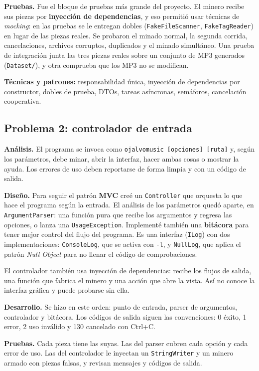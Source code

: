 \documentclass{article}
\begin{document}
\textbf{Pruebas.} Fue el bloque de pruebas más grande del proyecto. El
minero recibe sus piezas por \textbf{inyección de dependencias}, y eso
permitió usar técnicas de \emph{mocking}: en las pruebas se le entregan
dobles (\texttt{FakeFileScanner}, \texttt{FakeTagReader}) en lugar de las
piezas reales. Se probaron el minado normal, la segunda corrida,
cancelaciones, archivos corruptos, duplicados y el minado simultáneo. Una
prueba de integración junta las tres piezas reales sobre un conjunto de MP3
generados (\texttt{Dataset/}), y otra comprueba que los MP3 no se modifican.

\textbf{Técnicas y patrones:} responsabilidad única, inyección de
dependencias por constructor, dobles de prueba, DTOs, tareas asíncronas,
semáforos, cancelación cooperativa.

\subsection{Problema 2: controlador de entrada}

\textbf{Análisis.} El programa se invoca como
\texttt{ojalvomusic [opciones] [ruta]} y, según los parámetros, debe minar,
abrir la interfaz, hacer ambas cosas o mostrar la ayuda. Los errores de uso
deben reportarse de forma limpia y con un código de salida.

\textbf{Diseño.} Para seguir el patrón \textbf{MVC} creé un
\texttt{Controller} que orquesta lo que hace el programa según la entrada. El
análisis de los parámetros quedó aparte, en \texttt{ArgumentParser}: una
función pura que recibe los argumentos y regresa las opciones, o lanza una
\texttt{UsageException}. Implementé también una \textbf{bitácora} para tener
mejor control del flujo del programa. Es una interfaz (\texttt{ILog}) con dos
implementaciones: \texttt{ConsoleLog}, que se activa con \texttt{-l}, y
\texttt{NullLog}, que aplica el patrón \emph{Null Object} para no llenar el
código de comprobaciones.

El controlador también usa inyección de dependencias: recibe los flujos de
salida, una función que fabrica el minero y una acción que abre la vista. Así
no conoce la interfaz gráfica y puede probarse sin ella.

\textbf{Desarrollo.} Se hizo en este orden: punto de entrada, parser de
argumentos, controlador y bitácora. Los códigos de salida siguen las
convenciones: 0 éxito, 1 error, 2 uso inválido y 130 cancelado con Ctrl+C.

\textbf{Pruebas.} Cada pieza tiene las suyas. Las del parser cubren cada
opción y cada error de uso. Las del controlador le inyectan un
\texttt{StringWriter} y un minero armado con piezas falsas, y revisan
mensajes y códigos de salida.
\end{document}
